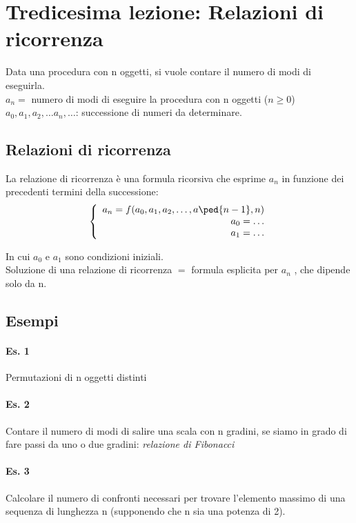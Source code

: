 \section{Tredicesima lezione: Relazioni di ricorrenza}

Data una procedura con n oggetti, si vuole contare il numero di modi di eseguirla.\\
$a_n =$ numero di modi di eseguire la procedura con n oggetti ($n \geq 0$)\\
$a_0, a_1, a_2, \dots a_n, \dots $: successione di numeri da determinare.

\subsection{Relazioni di ricorrenza} 
La relazione di ricorrenza è una formula ricorsiva che esprime $a_n$ in funzione dei
precedenti termini della successione:
\[ \left\{ 
    \begin{array}{rcl} 
    a_n = f(a_0, a_1, a_2, \dots , a\ped{n-1}, n) \\
    a_0= \dots \\
    a_1 = \dots 
    \end{array} \right. \]    

In cui $a_0$ e $a_1$ sono condizioni iniziali.   \\
Soluzione di una relazione di ricorrenza $=$ formula esplicita per $a_n$ , che dipende solo da n.

\subsection{Esempi}

\paragraph{Es. 1} Permutazioni di n oggetti distinti

\paragraph{Es. 2} Contare il numero di modi di salire una scala con n gradini, se siamo in grado di fare passi da
uno o due gradini: \textit{relazione di Fibonacci}

\paragraph{Es. 3} Calcolare il numero di confronti necessari per trovare l'elemento
massimo di una sequenza di lunghezza n (supponendo che n sia una potenza
di 2).

